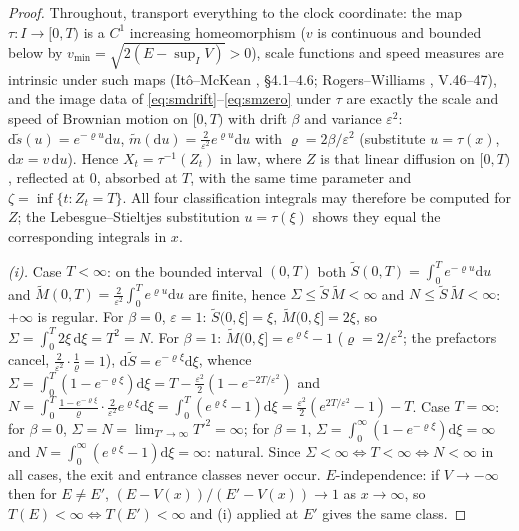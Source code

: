 \documentclass[11pt]{article}
\theoremstyle{remark}
\newcommand{\dd}{\mathrm{d}}
\begin{document}
\begin{proof}
Throughout, transport everything to the clock coordinate: the map
$\tau:I\to[0,T)$ is a $C^{1}$ increasing homeomorphism ($v$ is
continuous and bounded below by
$v_{\min}=\sqrt{2(E-\sup_{I}V)}>0$), scale functions and speed measures
are intrinsic under such maps (It\^o--McKean \cite{ItoMcKean},
\S4.1--4.6; Rogers--Williams \cite{RogersWilliams}, V.46--47), and the
image data of \eqref{eq:smdrift}--\eqref{eq:smzero} under $\tau$ are
exactly the scale and speed of Brownian motion on $[0,T)$ with drift
$\beta$ and variance $\varepsilon^{2}$:
$\dd \tilde s(u)=e^{-\varrho u}\dd u$,
$\tilde m(\dd u)=\tfrac{2}{\varepsilon^{2}}e^{\varrho u}\dd u$ with
$\varrho=2\beta/\varepsilon^{2}$ (substitute $u=\tau(x)$,
$\dd x=v\,\dd u$).  Hence $X_{t}=\tau^{-1}(Z_{t})$ in law, where $Z$ is
that linear diffusion on $[0,T)$, reflected at $0$, absorbed at $T$,
with the same time parameter and $\zeta=\inf\{t:Z_{t}=T\}$.  All four
classification integrals may therefore be computed for $Z$; the
Lebesgue--Stieltjes substitution $u=\tau(\xi)$ shows they equal the
corresponding integrals in $x$.

\emph{(i).}  Case $T<\infty$: on the bounded interval $(0,T)$ both
$\tilde S(0,T)=\int_{0}^{T}e^{-\varrho u}\dd u$ and
$\tilde M(0,T)=\tfrac{2}{\varepsilon^{2}}\int_{0}^{T}e^{\varrho u}\dd u$
are finite, hence $\Sigma\le \tilde S\,\tilde M<\infty$ and
$N\le \tilde S\,\tilde M<\infty$: $+\infty$ is regular.  For $\beta=0$,
$\varepsilon=1$: $\tilde S(0,\xi]=\xi$, $\tilde M(0,\xi]=2\xi$, so
$\Sigma=\int_{0}^{T}2\xi\,\dd\xi=T^{2}=N$.  For $\beta=1$:
$\tilde M(0,\xi]=e^{\varrho\xi}-1$ ($\varrho=2/\varepsilon^{2}$;
the prefactors cancel, $\tfrac{2}{\varepsilon^{2}}\cdot
\tfrac{1}{\varrho}=1$), $\dd\tilde S=e^{-\varrho\xi}\dd\xi$, whence
$\Sigma=\int_{0}^{T}(1-e^{-\varrho\xi})\dd\xi
=T-\tfrac{\varepsilon^{2}}{2}(1-e^{-2T/\varepsilon^{2}})$ and
$N=\int_{0}^{T}\tfrac{1-e^{-\varrho\xi}}{\varrho}\cdot
\tfrac{2}{\varepsilon^{2}}e^{\varrho\xi}\dd\xi
=\int_{0}^{T}(e^{\varrho\xi}-1)\dd\xi
=\tfrac{\varepsilon^{2}}{2}(e^{2T/\varepsilon^{2}}-1)-T$.
Case $T=\infty$: for $\beta=0$, $\Sigma=N=\lim_{T'\to\infty}T'^{2}
=\infty$; for $\beta=1$,
$\Sigma=\int_{0}^{\infty}(1-e^{-\varrho\xi})\dd\xi=\infty$ and
$N=\int_{0}^{\infty}(e^{\varrho\xi}-1)\dd\xi=\infty$: natural.  Since
$\Sigma<\infty\Leftrightarrow T<\infty\Leftrightarrow N<\infty$ in all
cases, the exit and entrance classes never occur.
$E$-independence: if $V\to-\infty$ then for $E\ne E'$,
$(E-V(x))/(E'-V(x))\to1$ as $x\to\infty$, so
$T(E)<\infty\Leftrightarrow T(E')<\infty$ and (i) applied at $E'$
gives the same class.


\end{proof}
\end{document}
